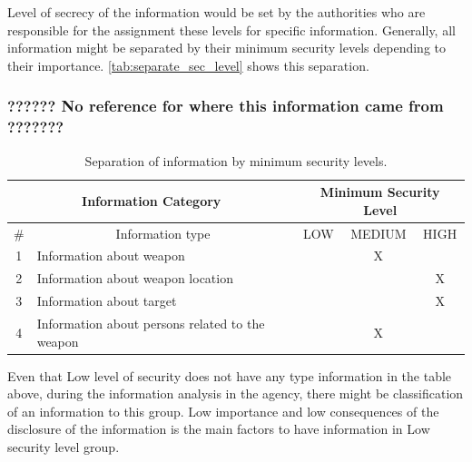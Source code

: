 \documentclass{report}
\begin{document}
Level of secrecy of the information would be set by the authorities who are responsible for the assignment these levels for specific information. Generally, all information might be separated by their minimum security levels depending to their importance. \autoref{tab:separate_sec_level}  shows this separation. 

\subsubsection{?????? No reference for where this information came from  ???????}


\begin{table}[h]
\centering
\begin{tabular}{|c|l|c|c|c|}
\hline
\multicolumn{2}{|c|}{Information Category}           & \multicolumn{3}{c|}{Minimum Security Level}                                                 \\ \hline
\# & \multicolumn{1}{c|}{Information type}           & \cellcolor[HTML]{34FF34}LOW & \cellcolor[HTML]{FCFF2F}MEDIUM & \cellcolor[HTML]{FE0000}HIGH \\ \hline
1  & Information about weapon                        & \cellcolor[HTML]{34FF34}    & \cellcolor[HTML]{FCFF2F}X      & \cellcolor[HTML]{FE0000}     \\ \hline
2  & Information about weapon location               & \cellcolor[HTML]{34FF34}    & \cellcolor[HTML]{FCFF2F}       & \cellcolor[HTML]{FE0000}X    \\ \hline
3  & Information about target                        & \cellcolor[HTML]{34FF34}    & \cellcolor[HTML]{FCFF2F}       & \cellcolor[HTML]{FE0000}X    \\ \hline
4  & Information about persons related to the weapon & \cellcolor[HTML]{34FF34}    & \cellcolor[HTML]{FCFF2F}X      & \cellcolor[HTML]{FE0000}     \\ \hline
\end{tabular}
\caption{Separation of information by minimum security levels.}
\label{tab:separate_sec_level}
\end{table}


Even that Low level of security does not have any type information in the table above, during the information analysis in the agency, there might be classification of an information to this group. Low importance and low consequences of the disclosure of the information is the main factors to have information in Low security level group.
\end{document}
